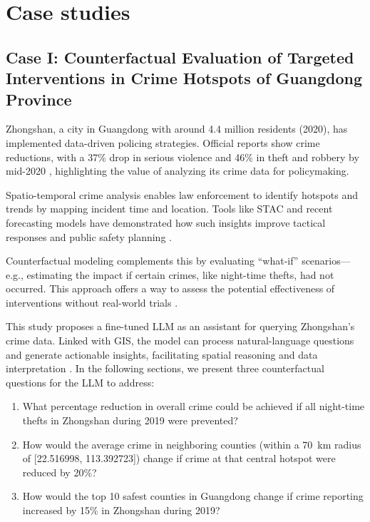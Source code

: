 
\section{Case studies}

\subsection{Case I: Counterfactual Evaluation of Targeted Interventions in Crime Hotspots of Guangdong Province}

Zhongshan, a city in Guangdong with around 4.4 million residents (2020), has implemented data-driven policing strategies. Official reports show crime reductions, with a 37\% drop in serious violence and 46\% in theft and robbery by mid-2020 \cite{Zhongshan2020}, highlighting the value of analyzing its crime data for policymaking.

Spatio-temporal crime analysis enables law enforcement to identify hotspots and trends by mapping incident time and location. Tools like STAC and recent forecasting models have demonstrated how such insights improve tactical responses and public safety planning \cite{Li2024UrbanGPT}.

Counterfactual modeling complements this by evaluating “what-if” scenarios—e.g., estimating the impact if certain crimes, like night-time thefts, had not occurred. This approach offers a way to assess the potential effectiveness of interventions without real-world trials \cite{CONSTANTINOU201641}.

This study proposes a fine-tuned LLM as an assistant for querying Zhongshan’s crime data. Linked with GIS, the model can process natural-language questions and generate actionable insights, facilitating spatial reasoning and data interpretation \cite{William2025}.
\noindent In the following sections, we present three counterfactual questions for the LLM to address:
\begin{enumerate}
  \item What percentage reduction in overall crime could be achieved if all night-time thefts in Zhongshan during 2019 were prevented?
  \item How would the average crime in neighboring counties (within a 70~km radius of [22.516998, 113.392723]) change if crime at that central hotspot were reduced by 20\%?
  \item How would the top 10 safest counties in Guangdong change if crime reporting increased by 15\% in Zhongshan during 2019?
\end{enumerate}

